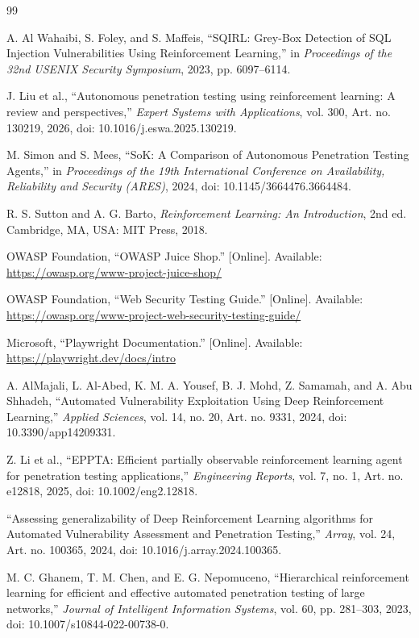 \documentclass[conference]{IEEEtran}
\begin{document}
\begin{thebibliography}{99}

A. Al Wahaibi, S. Foley, and S. Maffeis,
``SQIRL: Grey-Box Detection of SQL Injection Vulnerabilities
Using Reinforcement Learning,''
in \textit{Proceedings of the 32nd USENIX Security Symposium},
2023, pp. 6097--6114.

J. Liu et al.,
``Autonomous penetration testing using reinforcement learning:
A review and perspectives,''
\textit{Expert Systems with Applications},
vol. 300, Art. no. 130219, 2026,
doi: 10.1016/j.eswa.2025.130219.

M. Simon and S. Mees,
``SoK: A Comparison of Autonomous Penetration Testing Agents,''
in \textit{Proceedings of the 19th International Conference on
Availability, Reliability and Security (ARES)}, 2024,
doi: 10.1145/3664476.3664484.

R. S. Sutton and A. G. Barto,
\textit{Reinforcement Learning: An Introduction},
2nd ed. Cambridge, MA, USA: MIT Press, 2018.

OWASP Foundation,
``OWASP Juice Shop.''
[Online]. Available:
\url{https://owasp.org/www-project-juice-shop/}

OWASP Foundation,
``Web Security Testing Guide.''
[Online]. Available:
\url{https://owasp.org/www-project-web-security-testing-guide/}

Microsoft,
``Playwright Documentation.''
[Online]. Available:
\url{https://playwright.dev/docs/intro}

A. AlMajali, L. Al-Abed, K. M. A. Yousef,
B. J. Mohd, Z. Samamah, and A. Abu Shhadeh,
``Automated Vulnerability Exploitation Using Deep Reinforcement
Learning,''
\textit{Applied Sciences},
vol. 14, no. 20, Art. no. 9331, 2024,
doi: 10.3390/app14209331.

Z. Li et al.,
``EPPTA: Efficient partially observable reinforcement learning
agent for penetration testing applications,''
\textit{Engineering Reports},
vol. 7, no. 1, Art. no. e12818, 2025,
doi: 10.1002/eng2.12818.

``Assessing generalizability of Deep Reinforcement Learning
algorithms for Automated Vulnerability Assessment and
Penetration Testing,''
\textit{Array}, vol. 24, Art. no. 100365, 2024,
doi: 10.1016/j.array.2024.100365.

M. C. Ghanem, T. M. Chen, and E. G. Nepomuceno,
``Hierarchical reinforcement learning for efficient and effective
automated penetration testing of large networks,''
\textit{Journal of Intelligent Information Systems},
vol. 60, pp. 281--303, 2023,
doi: 10.1007/s10844-022-00738-0.

\end{thebibliography}
\end{document}
